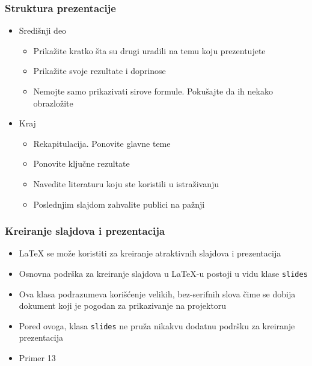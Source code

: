 \documentclass{beamer}
\begin{document}
\begin{frame}[fragile]\frametitle{Struktura prezentacije}
	\begin{itemize}			
		\item Središnji deo
		\begin{itemize}
			\item Prikažite kratko šta su drugi uradili na temu koju
			prezentujete
			\item Prikažite svoje rezultate i doprinose
			\item Nemojte samo prikazivati sirove formule. Pokušajte da ih nekako
			obrazložite
		\end{itemize}
		\item Kraj
		\begin{itemize}
			\item Rekapitulacija. Ponovite glavne teme
			\item Ponovite ključne rezultate
			\item Navedite literaturu koju ste koristili u istraživanju
			\item Poslednjim slajdom zahvalite publici na pažnji		
		\end{itemize}		
	\end{itemize}
\end{frame}



\begin{frame}[fragile]\frametitle{Kreiranje slajdova i prezentacija}
	\begin{itemize}	
		\item \LaTeX{} se može koristiti za kreiranje atraktivnih slajdova i prezentacija	
		\item Osnovna podrška za kreiranje slajdova u \LaTeX{}-u postoji u vidu klase \verb"slides"		
		\item Ova klasa podrazumeva korišćenje velikih, bez-serifnih slova čime se dobija dokument koji je pogodan za prikazivanje na projektoru		
		\item Pored ovoga, klasa \verb"slides" ne pruža nikakvu dodatnu podršku za kreiranje prezentacija		
		\item \textcolor{beamer@darkred}{Primer 13}
	\end{itemize}
\end{frame}
\end{document}
